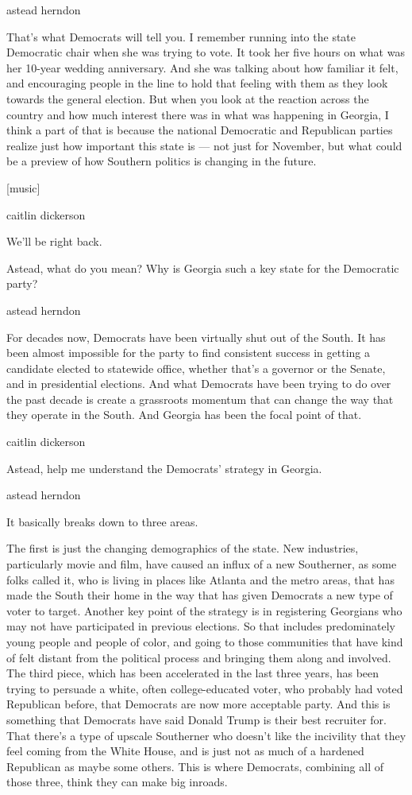 astead herndon

That's what Democrats will tell you. I remember running into the state
Democratic chair when she was trying to vote. It took her five hours on
what was her 10-year wedding anniversary. And she was talking about how
familiar it felt, and encouraging people in the line to hold that
feeling with them as they look towards the general election. But when
you look at the reaction across the country and how much interest there
was in what was happening in Georgia, I think a part of that is because
the national Democratic and Republican parties realize just how
important this state is --- not just for November, but what could be a
preview of how Southern politics is changing in the future.

{[}music{]}

caitlin dickerson

We'll be right back.

Astead, what do you mean? Why is Georgia such a key state for the
Democratic party?

astead herndon

For decades now, Democrats have been virtually shut out of the South. It
has been almost impossible for the party to find consistent success in
getting a candidate elected to statewide office, whether that's a
governor or the Senate, and in presidential elections. And what
Democrats have been trying to do over the past decade is create a
grassroots momentum that can change the way that they operate in the
South. And Georgia has been the focal point of that.

caitlin dickerson

Astead, help me understand the Democrats' strategy in Georgia.

astead herndon

It basically breaks down to three areas.

The first is just the changing demographics of the state. New
industries, particularly movie and film, have caused an influx of a new
Southerner, as some folks called it, who is living in places like
Atlanta and the metro areas, that has made the South their home in the
way that has given Democrats a new type of voter to target. Another key
point of the strategy is in registering Georgians who may not have
participated in previous elections. So that includes predominately young
people and people of color, and going to those communities that have
kind of felt distant from the political process and bringing them along
and involved. The third piece, which has been accelerated in the last
three years, has been trying to persuade a white, often college-educated
voter, who probably had voted Republican before, that Democrats are now
more acceptable party. And this is something that Democrats have said
Donald Trump is their best recruiter for. That there's a type of upscale
Southerner who doesn't like the incivility that they feel coming from
the White House, and is just not as much of a hardened Republican as
maybe some others. This is where Democrats, combining all of those
three, think they can make big inroads.

